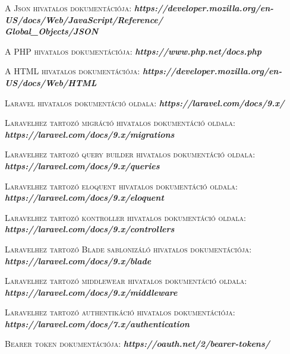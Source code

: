 \documentclass[
]{thesis-ekf}
\theoremstyle{definition}
\theoremstyle{remark}
\begin{document}
\begin{thebibliography}{2}
\textsc{A Json hivatalos dokumentációja:}
\newline
\emph{\bf{https://developer.mozilla.org/en-US/docs/Web/JavaScript/Reference/\\Global\_Objects/JSON}}

\textsc{A PHP hivatalos dokumentációja:}
\newline
\emph{\bf{https://www.php.net/docs.php}}

\textsc{A HTML hivatalos dokumentációja:}
\newline
\emph{\bf{https://developer.mozilla.org/en-US/docs/Web/HTML}}

\textsc{Laravel hivatalos dokumentáció oldala:}
\newline
\emph{\bf{https://laravel.com/docs/9.x/}}

\textsc{Laravelhez tartozó migráció hivatalos dokumentáció oldala:}
\newline
\emph{\bf{https://laravel.com/docs/9.x/migrations}}

\textsc{Laravelhez tartozó query builder hivatalos dokumentáció oldala:}
\newline
\emph{\bf{https://laravel.com/docs/9.x/queries}}

\textsc{Laravelhez tartozó eloquent hivatalos dokumentáció oldala:}
\newline
\emph{\bf{https://laravel.com/docs/9.x/eloquent}}

\textsc{Laravelhez tartozó kontroller hivatalos dokumentáció oldala:}
\newline
\emph{\bf{https://laravel.com/docs/9.x/controllers}}

\textsc{Laravelhez tartozó Blade sablonizáló hivatalos dokumentációja:}
\newline
\emph{\bf{https://laravel.com/docs/9.x/blade}}

\textsc{Laravelhez tartozó middlewear hivatalos dokumentáció oldala:}
\newline
\emph{\bf{https://laravel.com/docs/9.x/middleware}}

\textsc{Laravelhez tartozó authentikáció hivatalos dokumentációja:}
\newline
\emph{\bf{https://laravel.com/docs/7.x/authentication}}

\textsc{Bearer token dokumentációja:}
\newline
\emph{\bf{https://oauth.net/2/bearer-tokens/}}


\end{thebibliography}
\end{document}
